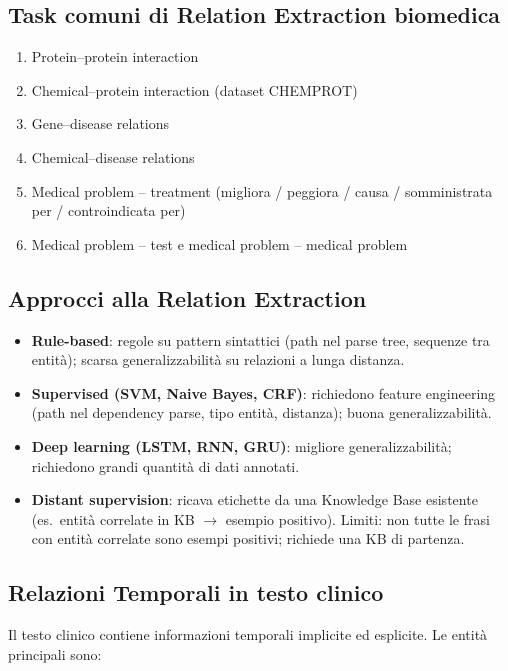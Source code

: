 \documentclass[a4paper,12pt]{article}
\begin{document}
\subsection{Task comuni di Relation Extraction biomedica}
\begin{enumerate}
    \item Protein--protein interaction
    \item Chemical--protein interaction (dataset CHEMPROT)
    \item Gene--disease relations
    \item Chemical--disease relations
    \item Medical problem -- treatment (migliora / peggiora / causa / somministrata per / controindicata per)
    \item Medical problem -- test e medical problem -- medical problem
\end{enumerate}

\subsection{Approcci alla Relation Extraction}
\begin{itemize}
    \item \textbf{Rule-based}: regole su pattern sintattici (path nel parse tree, sequenze tra entit\`a); scarsa generalizzabilit\`a su relazioni a lunga distanza.
    \item \textbf{Supervised (SVM, Naive Bayes, CRF)}: richiedono feature engineering (path nel dependency parse, tipo entit\`a, distanza); buona generalizzabilit\`a.
    \item \textbf{Deep learning (LSTM, RNN, GRU)}: migliore generalizzabilit\`a; richiedono grandi quantit\`a di dati annotati.
    \item \textbf{Distant supervision}: ricava etichette da una Knowledge Base esistente (es.\ entit\`a correlate in KB $\to$ esempio positivo). Limiti: non tutte le frasi con entit\`a correlate sono esempi positivi; richiede una KB di partenza.
\end{itemize}

\subsection{Relazioni Temporali in testo clinico}
Il testo clinico contiene informazioni temporali implicite ed esplicite. Le entit\`a principali sono:
\end{document}
